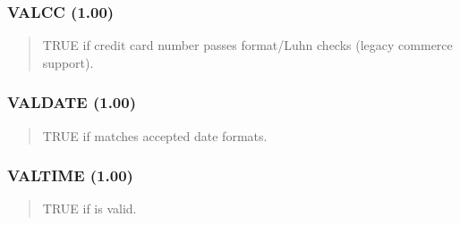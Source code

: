 \documentclass[letterpaper,10pt,english]{sphinxmanual}
\begin{document}
\subsubsection{VALCC (1.00)}
\label{\detokenize{ppl:valcc-1-00}}\begin{quote}

\sphinxAtStartPar
{}
\begin{description}
\sphinxAtStartPar
TRUE if credit card number passes format/Luhn checks (legacy commerce support).

\end{description}
\end{quote}


\subsubsection{VALDATE (1.00)}
\label{\detokenize{ppl:valdate-1-00}}\begin{quote}

\sphinxAtStartPar
{}
\begin{description}
\sphinxAtStartPar
TRUE if  matches accepted date formats.

\end{description}
\end{quote}


\subsubsection{VALTIME (1.00)}
\label{\detokenize{ppl:valtime-1-00}}\begin{quote}

\sphinxAtStartPar
{}
\begin{description}
\sphinxAtStartPar
TRUE if  is valid.

\end{description}
\end{quote}
\end{document}
